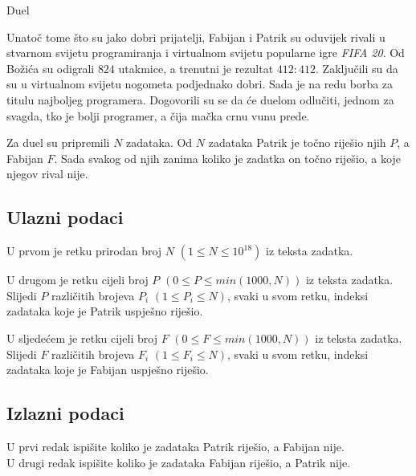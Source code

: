 \begin{statement}[
  problempoints=30,
  timelimit=1 sekunda,
  memorylimit=512 MiB,
]{Duel}


Unatoč tome što su jako dobri prijatelji, Fabijan i Patrik su oduvijek rivali u
stvarnom svijetu programiranja i virtualnom svijetu popularne igre
\textit{FIFA 20}. Od Božića su odigrali $824$ utakmice, a
trenutni je rezultat $412:412$. Zaključili su da su u virtualnom svijetu
nogometa podjednako dobri. Sada je na redu borba za titulu najboljeg programera.
Dogovorili su se da će duelom odlučiti, jednom za svagda, tko je bolji
programer, a čija mačka crnu vunu prede.

Za duel su pripremili $N$ zadataka. Od $N$ zadataka Patrik je točno riješio
njih $P$, a Fabijan $F$. Sada svakog od njih zanima koliko je zadatka on
točno riješio, a koje njegov rival nije.

\subsection*{Ulazni podaci}
U prvom je retku prirodan broj $N$ $(1 \le N \le 10^{18})$ iz teksta zadatka.

U drugom je retku cijeli broj $P$ $(0 \le P \le min(1000, N))$ iz teksta
zadatka.  Slijedi $P$ različitih brojeva $P_i$ $(1 \le P_i \le N)$, svaki u
svom retku, indeksi zadataka koje je Patrik uspješno riješio.

U sljedećem je retku cijeli broj $F$ $(0 \le F \le min(1000, N))$ iz teksta
zadatka.  Slijedi $F$ različitih brojeva $F_i$ $(1 \le F_i \le N)$, svaki u
svom retku, indeksi zadataka koje je Fabijan uspješno riješio.

\subsection*{Izlazni podaci}
U prvi redak ispišite koliko je zadataka Patrik riješio, a Fabijan nije.\\
U drugi redak ispišite koliko je zadataka Fabijan riješio, a Patrik nije.



\end{statement}
